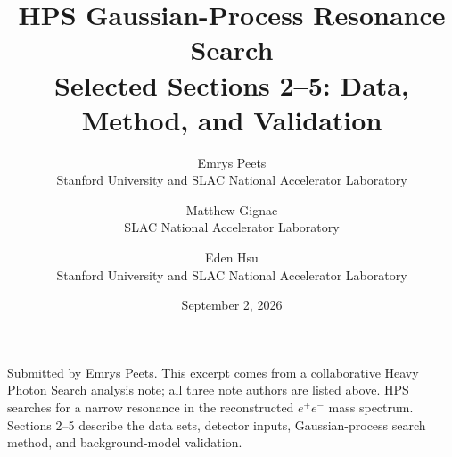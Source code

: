 \documentclass[11pt]{article}
\title{\vspace{1.3in}HPS Gaussian-Process Resonance Search\\[0.5em]
\large Selected Sections 2--5: Data, Method, and Validation}
\author{
Emrys Peets\\Stanford University and SLAC National Accelerator Laboratory
\and
Matthew Gignac\\SLAC National Accelerator Laboratory
\and
Eden Hsu\\Stanford University and SLAC National Accelerator Laboratory
}
\date{September 2, 2026}
\begin{document}
\hypersetup{pageanchor=false}
\begin{titlepage}
\maketitle
\vfill
\begin{center}
\begin{minipage}{0.84\textwidth}
\small
Submitted by Emrys Peets. This excerpt comes from a collaborative Heavy Photon Search
analysis note; all three note authors are listed above. HPS searches for a narrow
resonance in the reconstructed $e^+e^-$ mass spectrum. Sections 2--5 describe the
data sets, detector inputs, Gaussian-process search method, and background-model
validation.
\end{minipage}
\end{center}
\vfill
\thispagestyle{empty}
\end{titlepage}

\hypersetup{pageanchor=true}
\setcounter{page}{1}
\setcounter{section}{1}
\setcounter{tocdepth}{2}
\tableofcontents
\clearpage


\FloatBarrier
\clearpage


\FloatBarrier
\clearpage


\FloatBarrier
\clearpage



\FloatBarrier

\clearpage


\end{document}
